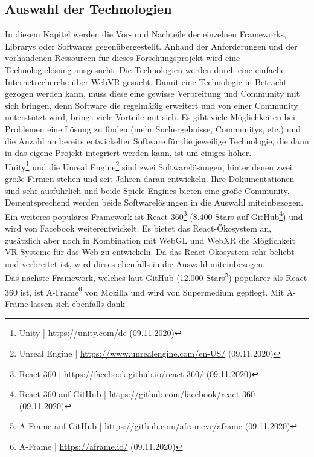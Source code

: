 \documentclass[a4paper,12pt,oneside]{article}
\begin{document}
    \subsection{Auswahl der Technologien}
      In diesem Kapitel werden die Vor- und Nachteile der einzelnen Frameworks, Librarys
      oder Softwares gegenübergestellt. Anhand der Anforderungen und der vorhandenen
      Ressourcen für dieses Forschungsprojekt wird eine Technologielösung ausgesucht.
      Die Technologien werden durch eine einfache Internetrecherche über WebVR gesucht.
      Damit eine Technologie in Betracht gezogen werden kann, muss diese eine gewisse
      Verbreitung und Community mit sich bringen, denn Software die regelmäßig erweitert
      und von einer Community unterstützt wird, bringt viele Vorteile mit sich. Es gibt
      viele Möglichkeiten bei Problemen eine Lösung zu finden (mehr Suchergebnisse, 
      Communitys, etc.) und die Anzahl an bereits entwickelter Software für die jeweilige
      Technologie, die dann in das eigene Projekt integriert werden kann, ist um
      einiges höher.\\
      Unity\footnote{Unity | \url{https://unity.com/de} (09.11.2020)} und die 
      Unreal Engine\footnote{Unreal Engine | \url{https://www.unrealengine.com/en-US/} (09.11.2020)} 
      sind zwei Softwarelösungen, hinter denen zwei große
      Firmen stehen und seit Jahren daran entwickeln. Ihre Dokumentationen sind sehr
      ausführlich und beide Spiele-Engines bieten eine große Community. Dementsprechend
      werden beide Softwarelösungen in die Auswahl miteinbezogen.\\
      Ein weiteres populäres Framework ist React 360\footnote{React 360 | \url{https://facebook.github.io/react-360/} (09.11.2020)}
      (8.400 Stars auf GitHub\footnote{React 360 auf GitHub | \url{https://github.com/facebook/react-360} (09.11.2020)})
      und wird von Facebook weiterentwickelt. Es bietet das React-Ökosystem an,
      zusätzlich aber noch in Kombination mit WebGL und WebXR die Möglichkeit VR-Systeme
      für das Web zu entwickeln. Da das React-Ökosystem sehr beliebt und verbreitet
      ist, wird dieses ebenfalls in die Auswahl miteinbezogen.\\
      Das nächste Framework, welches laut GitHub (12.000 Stars\footnote{A-Frame auf GitHub | \url{https://github.com/aframevr/aframe} (09.11.2020)}) 
      populärer als React 360 ist, ist A-Frame\footnote{A-Frame | \url{https://aframe.io/} (09.11.2020)}
      von Mozilla und wird von Supermedium gepflegt. Mit A-Frame lassen sich ebenfalls dank
\end{document}
